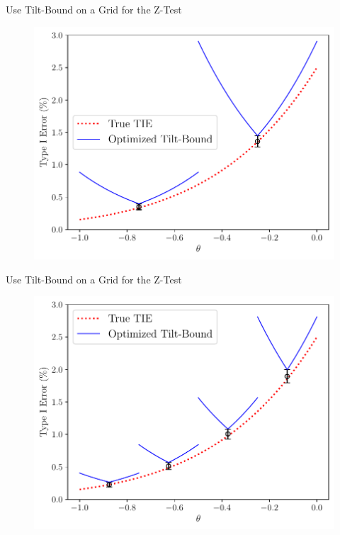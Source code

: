 \begin{frame}{Use Tilt-Bound on a Grid for the Z-Test}
\begin{figure}
    \centering
    \includegraphics[width=0.95\linewidth]{figs/validation_2.pdf}
\end{figure} 
\end{frame}

\begin{frame}{Use Tilt-Bound on a Grid for the Z-Test}
\begin{figure}
    \centering
    \includegraphics[width=0.95\linewidth]{figs/validation_4.pdf}
\end{figure} 
\end{frame}

